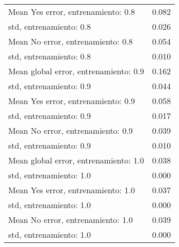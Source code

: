 \begin{longtable}{p{4cm}|p{1.5cm}}
Mean Yes error, entrenamiento: 0.8    &                        0.082 \\
std, entrenamiento: 0.8               &                        0.026 \\
Mean No error, entrenamiento: 0.8     &                        0.054 \\
std, entrenamiento: 0.8               &                        0.010 \\
Mean global error, entrenamiento: 0.9 &                        0.162 \\
std, entrenamiento: 0.9               &                        0.044 \\
Mean Yes error, entrenamiento: 0.9    &                        0.058 \\
std, entrenamiento: 0.9               &                        0.017 \\
Mean No error, entrenamiento: 0.9     &                        0.039 \\
std, entrenamiento: 0.9               &                        0.010 \\
Mean global error, entrenamiento: 1.0 &                        0.038 \\
std, entrenamiento: 1.0               &                        0.000 \\
Mean Yes error, entrenamiento: 1.0    &                        0.037 \\
std, entrenamiento: 1.0               &                        0.000 \\
Mean No error, entrenamiento: 1.0     &                        0.039 \\
std, entrenamiento: 1.0               &                        0.000 \\
\end{longtable}
